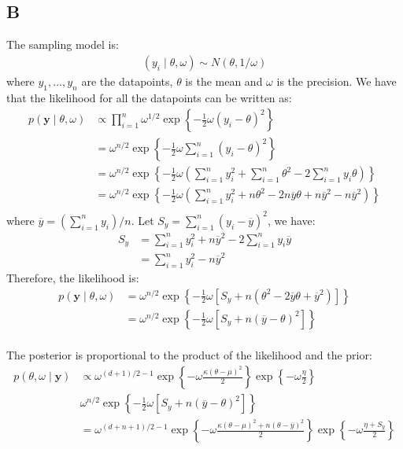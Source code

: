 \documentclass{article}
\begin{document}
\subsection*{B}
The sampling model is:
\begin{align*}
(y_i\mid \theta, \omega) \sim N(\theta, 1/\omega)
\end{align*}
where \(y_1, \dots, y_n\) are the datapoints, \(\theta\) is the mean and \(\omega\) is the precision. We have that the likelihood for all the datapoints can be written as:
\begin{align*}
p(\mathbf{y} \mid \theta, \omega) &\propto \prod_{i=1}^n \omega^{1/2} \exp \left\lbrace -\frac{1}{2}\omega (y_i - \theta)^2 \right\rbrace\\
&= \omega^{n/2} \exp \left\lbrace -\frac{1}{2}\omega \sum_{i=1}^n (y_i - \theta)^2 \right\rbrace\\ 
&= \omega^{n/2} \exp \left\lbrace -\frac{1}{2}\omega \left( \sum_{i=1}^n y_i^2 + \sum_{i=1}^n\theta^2 - 2\sum_{i=1}^n y_i\theta\right) \right\rbrace\\ 
&= \omega^{n/2} \exp \left\lbrace -\frac{1}{2}\omega \left( \sum_{i=1}^n y_i^2 + n\theta^2 - 2n\overline{y}\theta + n\overline{y}^2 - n\overline{y}^2 \right) \right\rbrace\\ 
\end{align*}
where \(\overline{y} = \left(\sum_{i=1}^n y_i\right)/n\). Let \(S_y = \sum_{i=1}^n (y_i - \overline{y})^2\), we have:
\begin{align*}
S_y &= \sum_{i=1}^n y_i^2 + n \overline{y}^2 - 2 \sum_{i=1}^n y_i \overline{y}\\
&= \sum_{i=1}^n y_i^2 - n\overline{y}^2
\end{align*}
Therefore, the likelihood is:
\begin{align*}
p(\mathbf{y} \mid \theta, \omega) &= \omega^{n/2} \exp \left\lbrace -\frac{1}{2}\omega \left[ S_y + n(\theta^2 - 2\overline{y}\theta + \overline{y}^2) \right] \right\rbrace\\ 
&= \omega^{n/2} \exp \left\lbrace -\frac{1}{2}\omega \left[ S_y +  n (\overline{y} - \theta)^2\right] \right\rbrace\\ 
\end{align*}

The posterior is proportional to the product of the likelihood and the prior:
\begin{align*}
p(\theta, \omega \mid \mathbf{y}) &\propto \omega^{(d+1)/2 - 1} \exp\left\lbrace - \omega \frac{\kappa(\theta-\mu)^2}{2} \right\rbrace \exp\left\lbrace -\omega \frac{\eta}{2}\right\rbrace\\
&\omega^{n/2} \exp \left\lbrace -\frac{1}{2}\omega \left[ S_y +  n (\overline{y} - \theta)^2\right] \right\rbrace\\ 
&= \omega^{(d+n+1)/2 - 1}\exp\left\lbrace - \omega \frac{\kappa(\theta-\mu)^2 + n(\theta - \overline{y})^2}{2} \right\rbrace \exp\left\lbrace -\omega \frac{\eta + S_y}{2}\right\rbrace\\
\end{align*}
\end{document}
